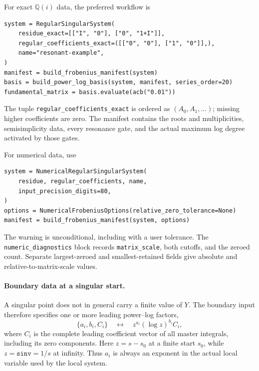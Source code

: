 \documentclass[11pt]{article}
\begin{document}
For exact $\mathbb Q(i)$ data, the preferred workflow is
\begin{verbatim}
system = RegularSingularSystem(
    residue_exact=[["I", "0"], ["0", "1+I"]],
    regular_coefficients_exact=([["0", "0"], ["1", "0"]],),
    name="resonant-example",
)
manifest = build_frobenius_manifest(system)
basis = build_power_log_basis(system, manifest, series_order=20)
fundamental_matrix = basis.evaluate(acb("0.01"))
\end{verbatim}
The tuple \texttt{regular\_coefficients\_exact} is ordered as
$(A_0,A_1,\ldots)$; missing higher coefficients are zero.  The manifest contains the roots
and multiplicities, semisimplicity data, every resonance gate, and the actual maximum log
degree activated by those gates.

For numerical data, use
\begin{verbatim}
system = NumericalRegularSingularSystem(
    residue, regular_coefficients, name,
    input_precision_digits=80,
)
options = NumericalFrobeniusOptions(relative_zero_tolerance=None)
manifest = build_frobenius_manifest(system, options)
\end{verbatim}
The warning is unconditional, including with a user tolerance.  The
\texttt{numeric\_diagnostics} block records \texttt{matrix\_scale}, both cutoffs, and the
zeroed count.  Separate largest-zeroed and smallest-retained fields give absolute and
relative-to-matrix-scale values.

\paragraph{Boundary data at a singular start.}
\label{sec:frobenius-boundary}

A singular point does not in general carry a finite value of $Y$.  The boundary input
therefore specifies one or more leading power--log factors,
\begin{equation}
  \bigl\{a_i,b_i,C_i\bigr\}
  \quad\longleftrightarrow\quad
  z^{a_i}(\log z)^{b_i}C_i,
  \label{eq:frobenius-boundary-record}
\end{equation}
where $C_i$ is the complete leading coefficient vector of all master integrals, including
its zero components.  Here $z=s-s_0$ at a finite start $s_0$, while $z=\texttt{sinv}=1/s$
at infinity.  Thus $a_i$ is always an exponent in the actual local variable used by the
local system.
\end{document}
